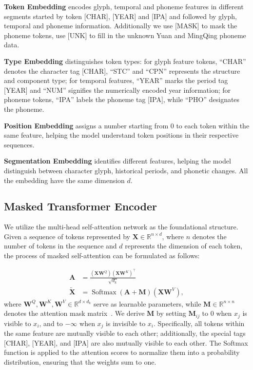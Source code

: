 \noindent\textbf{Token Embedding} encodes glyph, temporal and phoneme features in different segments started by token [CHAR], [YEAR] and [IPA] and followed by glyph, temporal and phoneme information. Additionally we use [MASK] to mask the phoneme tokens, use [UNK] to fill in the unknown Yuan and MingQing phoneme data.

\noindent\textbf{Type Embedding}  distinguishes token types: for glyph feature tokens, ``CHAR'' denotes the character tag [CHAR], ``STC'' and ``CPN'' represents the structure and component type; for temporal features, ``YEAR'' marks the period tag [YEAR] and ``NUM'' signifies the numerically encoded year information; for phoneme tokens, ``IPA'' labels the phoneme tag [IPA], while ``PHO'' designates the phoneme.

\noindent\textbf{Position Embedding} assigns a number starting from 0 to each token within the same feature, helping the model understand token positions in their respective sequences.

\noindent\textbf{Segmentation Embedding} identifies different features, helping the model distinguish between character glyph, historical periods, and phonetic changes. All the embedding have the same dimension $d$.

\subsection{Masked Transformer Encoder}
We utilize the multi-head self-attention network as the foundational structure. Given a sequence of tokens represented by $\mathbf{X} \in \mathbb{R}^{n \times d}$, where $n$ denotes the number of tokens in the sequence and $d$ represents the dimension of each token, the process of masked self-attention can be formulated as follows:

\begin{align*}
\mathbf{A} &=\frac{(\mathbf{X} \mathbf{W}^{Q})(\mathbf{X} \mathbf{W}^{K})^{\top}}{\sqrt{d_{k}}} \\
\widetilde{\mathbf{X}} &=\operatorname{Softmax}(\mathbf{A}+\mathbf{M})(\mathbf{X} \mathbf{W}^{V}),
\end{align*}
\noindent
where $\mathbf{W}^{Q}, \mathbf{W}^{K}, \mathbf{W}^{V} \in \mathbb{R}^{d \times d_{k}}$ serve as learnable parameters, while $\mathbf{M} \in \mathbb{R}^{n \times n}$ denotes the attention mask matrix~\cite{liu2020k}. We derive $\mathbf{M}$ by setting $\mathbf{M}_{ij}$ to 0 when $x_{j}$ is visible to $x_{i}$, and to $-\infty$ when $x_{j}$ is invisible to $x_{i}$. Specifically, all tokens within the same feature are mutually visible to each other; additionally, the special tags [CHAR], [YEAR], and [IPA] are also mutually visible to each other. The Softmax function is applied to the attention scores to normalize them into a probability distribution, ensuring that the weights sum to one.

